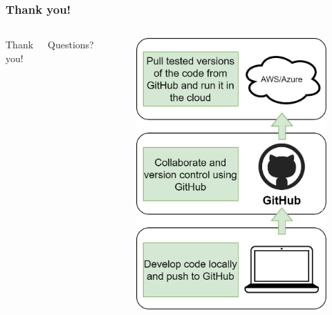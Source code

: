 \documentclass[aspectratio=169]{beamer} %
\begin{document}
\begin{frame}
	\frametitle{Thank you!}
	
	\begin{columns}[c]
		
		
		\Huge Thank you!
		
		\vspace{1cm}
		
		\Huge Questions?
		
		\begin{figure}
			\centering
			\includegraphics[width=.7\textwidth]{./img/code-workflow.png}
		\end{figure}
	
	\end{columns}
\end{frame}
\end{document}
